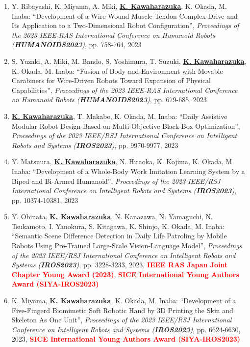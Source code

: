 \documentclass[letterpaper]{article}
\begin{document}
\begin{enumerate}
\item Y. Ribayashi, K. Miyama, A. Miki, \underline{\textbf{K. Kawaharazuka}}, K. Okada, M. Inaba: ``Development of a Wire-Wound Muscle-Tendon Complex Drive and Its Application to a Two-Dimensional Robot Configuration'', \textit{Proceedings of the 2023 IEEE-RAS International Conference on Humanoid Robots (\textit{\textbf{HUMANOIDS2023}})}, pp. 758-764, 2023
\item S. Yuzaki, A. Miki, M. Bando, S. Yoshimura, T. Suzuki, \underline{\textbf{K. Kawaharazuka}}, K. Okada, M. Inaba: ``Fusion of Body and Environment with Movable Carabiners for Wire-Driven Robots Toward Expansion of Physical Capabilities'', \textit{Proceedings of the 2023 IEEE-RAS International Conference on Humanoid Robots (\textit{\textbf{HUMANOIDS2023}})}, pp. 679-685, 2023
\item \underline{\textbf{K. Kawaharazuka}}, T. Makabe, K. Okada, M. Inaba: ``Daily Assistive Modular Robot Design Based on Multi-Objective Black-Box Optimization'', \textit{Proceedings of the 2023 IEEE/RSJ International Conference on Intelligent Robots and Systems (\textit{\textbf{IROS2023}})}, pp. 9970-9977, 2023
\item Y. Matsuura, \underline{\textbf{K. Kawaharazuka}}, N. Hiraoka, K. Kojima, K. Okada, M. Inaba: ``Development of a Whole-Body Work Imitation Learning System by a Biped and Bi-Armed Humanoid'', \textit{Proceedings of the 2023 IEEE/RSJ International Conference on Intelligent Robots and Systems (\textit{\textbf{IROS2023}})}, pp. 10374-10381, 2023
\item Y. Obinata, \underline{\textbf{K. Kawaharazuka}}, N. Kanazawa, N. Yamaguchi, N. Tsukamoto, I. Yanokura, S. Kitagawa, K. Shinjo, K. Okada, M. Inaba: ``Semantic Scene Difference Detection in Daily Life Patroling by Mobile Robots Using Pre-Trained Large-Scale Vision-Language Model'', \textit{Proceedings of the 2023 IEEE/RSJ International Conference on Intelligent Robots and Systems (\textit{\textbf{IROS2023}})}, pp. 3228-3233, 2023, \textbf{\textcolor{red}{IEEE RAS Japan Joint Chapter Young Award (2023)}}, \textbf{\textcolor{red}{SICE International Young Authors Award (SIYA-IROS2023)}}
\item K. Miyama, \underline{\textbf{K. Kawaharazuka}}, K. Okada, M. Inaba: ``Development of a Five-Fingerd Biomimetic Soft Robotic Hand by 3D Printing the Skin and Skeleton As One Unit'', \textit{Proceedings of the 2023 IEEE/RSJ International Conference on Intelligent Robots and Systems (\textit{\textbf{IROS2023}})}, pp. 6624-6630, 2023, \textbf{\textcolor{red}{SICE International Young Authors Award (SIYA-IROS2023)}}

\end{enumerate}
\end{document}
